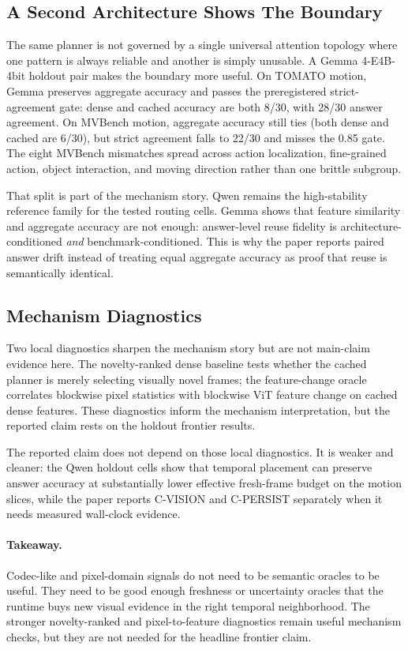 \subsection{A Second Architecture Shows The Boundary}

The same planner is not governed by a single universal attention topology
where one pattern is always reliable and another is simply unusable. A Gemma
4-E4B-4bit holdout pair makes the boundary more useful. On TOMATO motion,
Gemma preserves aggregate accuracy
and passes the preregistered strict-agreement gate: dense and cached accuracy
are both 8/30, with 28/30 answer agreement. On MVBench motion, aggregate
accuracy still ties (both dense and cached are 6/30), but
strict agreement falls to 22/30 and misses the 0.85 gate. The eight MVBench
mismatches spread across action localization, fine-grained action, object
interaction, and moving direction rather than one brittle subgroup.

That split is part of the mechanism story. Qwen remains the high-stability
reference family for the tested routing cells. Gemma shows that feature
similarity and aggregate accuracy are not enough: answer-level reuse fidelity
is architecture-conditioned \emph{and} benchmark-conditioned. This is why the
paper reports paired answer drift instead of treating equal aggregate accuracy
as proof that reuse is semantically identical.

\subsection{Mechanism Diagnostics}

Two local diagnostics sharpen the mechanism story but are not main-claim
evidence here. The novelty-ranked dense baseline tests
whether the cached planner is merely selecting visually novel frames; the
feature-change oracle correlates blockwise pixel statistics with blockwise ViT
feature change on cached dense features. These diagnostics inform the
mechanism interpretation, but the reported claim rests on the holdout
frontier results.

The reported claim does not depend on those local diagnostics. It is
weaker and cleaner: the Qwen holdout cells show that temporal placement can
preserve answer accuracy at substantially lower effective fresh-frame budget on
the motion slices, while the paper reports C-VISION and C-PERSIST separately
when it needs measured wall-clock evidence.

\paragraph{Takeaway.}
Codec-like and pixel-domain signals do not need to be semantic oracles to be
useful. They need to be good enough freshness or uncertainty oracles that the
runtime buys new visual evidence in the right temporal neighborhood. The
stronger novelty-ranked and pixel-to-feature diagnostics remain useful
mechanism checks, but they are not needed for the headline frontier claim.
